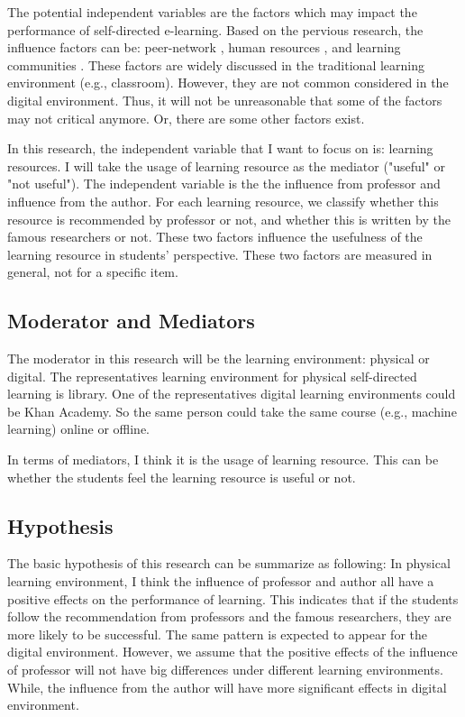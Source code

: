 \documentclass[man,biblatex,apacite]{apa6}
\begin{document}
The potential independent variables are the factors which may impact the performance of self-directed e-learning.
Based on the pervious research, the influence factors can be: peer-network \cite{Brookfield1985}, human resources \cite{Candy1991,Brockett2019}, and learning communities \cite{Abdullah2001}.
These factors are widely discussed in the traditional learning environment (e.g., classroom).
However, they are not common considered in the digital environment.
Thus, it will not be unreasonable that some of the factors may not critical anymore. 
Or, there are some other factors exist.


In this research, the independent variable that I want to focus on is: learning resources.
I will take the usage of learning resource as the mediator ("useful" or "not useful"). 
The independent variable is the the influence from professor and influence from the author.
For each learning resource, we classify whether this resource is recommended by professor or not, and whether this is written by the famous researchers or not.
These two factors influence the usefulness of the learning resource in students' perspective.
These two factors are measured in general, not for a specific item.

\subsection{Moderator and Mediators}
The moderator in this research will be the learning environment: physical or digital.
The representatives learning environment for physical self-directed learning is library.
One of the representatives digital learning environments could be Khan Academy.
So the same person could take the same course (e.g., machine learning) online or offline.

In terms of mediators, I think it is the usage of learning resource.
This can be whether the students feel the learning resource is useful or not.


\subsection{Hypothesis}
The basic hypothesis of this research can be summarize as following:
In physical learning environment, I think the influence of professor and author all have a positive effects on the performance of learning.
This indicates that if the students follow the recommendation from professors and the famous researchers, they are more likely to be successful.
The same pattern is expected to appear for the digital environment.
However, we assume that the positive effects of the influence of professor will not have big differences under different learning environments.
While, the influence from the author will have more significant effects in digital environment.
\end{document}
